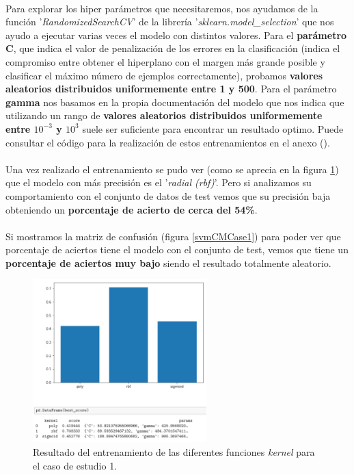 {\paragraph{}
Para explorar los hiper parámetros que necesitaremos, nos ayudamos de la función '\textit{RandomizedSearchCV}' de la librería '\textit{sklearn.model\_selection}' que nos ayudo a ejecutar varias veces el modelo con distintos valores. Para el \textbf{parámetro C}, que indica el valor de penalización de los errores en la clasificación (indica el compromiso entre obtener el hiperplano con el margen más grande posible y clasificar el máximo número de ejemplos correctamente), probamos \textbf{valores aleatorios distribuidos uniformemente entre 1 y 500}. Para el parámetro \textbf{gamma} nos basamos en la propia documentación del modelo que nos indica que utilizando un rango de \textbf{valores aleatorios distribuidos uniformemente entre $10^{-3}$ y $10^{3}$} suele ser suficiente para encontrar un resultado optimo. Puede consultar el código para la realización de estos entrenamientos en el anexo ().

\paragraph{}
Una vez realizado el entrenamiento se pudo ver (como se aprecia en la figura \ref{svmTrainCase1}) que el modelo con más precisión es el '\textit{radial (rbf)}'. Pero si analizamos su comportamiento con el conjunto de datos de test vemos que su precisión baja obteniendo un \textbf{porcentaje de acierto de cerca del 54\%}.

\paragraph{}
Si mostramos la matriz de confusión\cite{ref:confusion_matrix} (figura \ref{svmCMCase1}) para poder ver que porcentaje de aciertos tiene el modelo con el conjunto de test, vemos que tiene un \textbf{porcentaje de aciertos muy bajo} siendo el resultado totalmente aleatorio.

\begin{figure}[!htb]
  \centering
		\includegraphics[width=0.6\textwidth]{images/resultados_svm_ent_conjunto1.png}
		\caption{Resultado del entrenamiento de las diferentes funciones \textit{kernel} para el caso de estudio 1.}
  \label{svmTrainCase1}
\end{figure}

}
